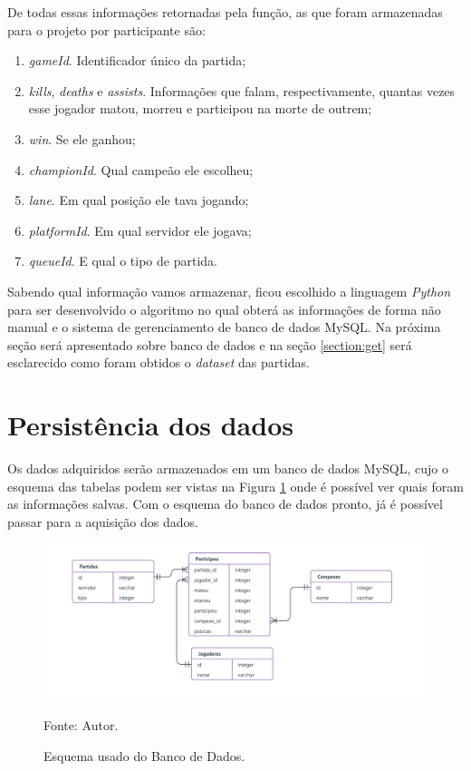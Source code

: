 De todas essas informações retornadas pela função, as que foram armazenadas para o projeto por participante são:

\begin{enumerate}
\item \textit{gameId}. Identificador único da partida;
\item \textit{kills}, \textit{deaths} e \textit{assists}. Informações que falam, respectivamente, quantas vezes esse jogador matou, morreu e participou na morte de outrem;
\item \textit{win}. Se ele ganhou;
\item \textit{championId}. Qual campeão ele escolheu;
\item \textit{lane}. Em qual posição ele tava jogando;
\item \textit{platformId}. Em qual servidor ele jogava;
\item \textit{queueId}. E qual o tipo de partida.
\end{enumerate}

Sabendo qual informação vamos armazenar, ficou escolhido a linguagem \textit{Python} para ser desenvolvido o algoritmo no qual obterá as informações de forma não manual e o sistema de gerenciamento de banco de dados MySQL. Na próxima seção será apresentado sobre banco de dados e na seção \ref{section:get} será esclarecido como foram obtidos o \textit{dataset} das partidas. 


\section{Persistência dos dados}
Os dados adquiridos serão armazenados em um banco de dados MySQL, cujo o esquema das tabelas podem ser vistas na Figura \ref{fig:bd} onde é possível ver quais foram as informações salvas. Com o esquema do banco de dados pronto, já é possível passar para a aquisição dos dados.
\begin{figure}[H]
	\caption{Esquema usado do Banco de Dados.}
	\begin{center}
		\includegraphics[width=17cm]{imagens/esquema.png}
	\end{center}
	\small{Fonte: Autor.}
	\label{fig:bd}
\end{figure}


